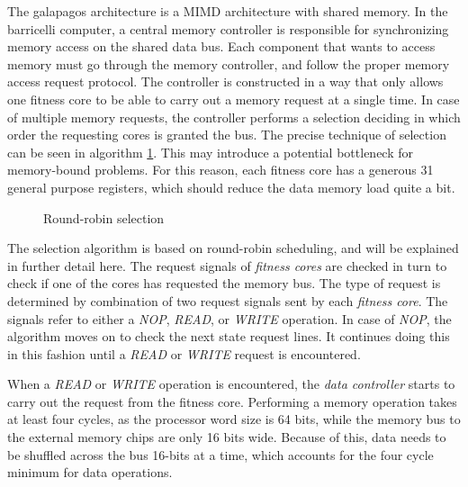 The \gls{galapagos} architecture is a \gls{MIMD} architecture with shared memory.
In the \Gls{barricelli} computer, a central memory controller is responsible for synchronizing memory access on the shared data bus.
Each component that wants to access memory must go through the memory controller, and follow the proper memory access request protocol.
The controller is constructed in a way that only allows one fitness core to be able to carry out a memory request at a single time.
In case of multiple memory requests, the controller performs a selection deciding in which order the requesting cores is granted the bus.
The precise technique of selection can be seen in algorithm \ref{algorithm:round-robin-selection}.
This may introduce a potential bottleneck for memory-bound problems.
For this reason, each fitness core has a generous 31 general purpose registers, which should reduce the data memory load quite a bit.

\begin{figure}[H]
\begin{algorithm}[H]
\SetAlgoLined
\DontPrintSemicolon
{}
\caption{Round-robin selection}
\label{algorithm:round-robin-selection}
\end{algorithm}
\end{figure}


The selection algorithm is based on round-robin scheduling, and will be explained in further detail here.
The request signals of \emph{fitness cores} are checked in turn to check if one of the cores has requested the memory bus.
The type of request is determined by combination of two request signals sent by each \emph{fitness core}.
The signals refer to either a \emph{NOP}, \emph{READ}, or \emph{WRITE} operation.
In case of \emph{NOP}, the algorithm moves on to check the next state request lines.
It continues doing this in this fashion until a \emph{READ} or \emph{WRITE} request is encountered. 

When a \emph{READ} or \emph{WRITE} operation is encountered, the \emph{data controller} starts to carry out the request from the fitness core.
Performing a memory operation takes at least four cycles, as the processor word size is 64 bits, while the memory bus to the external memory chips are only 16 bits wide.
Because of this, data needs to be shuffled across the bus 16-bits at a time, which accounts for the four cycle minimum for data operations.

